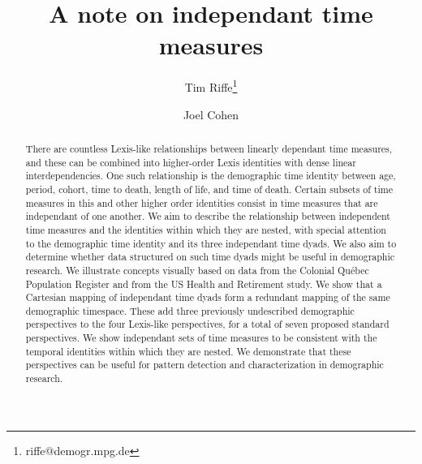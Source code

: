 


\title{A note on independant time measures}

\author[1]{Tim Riffe\thanks{riffe@demogr.mpg.de}}
\author[2]{Joel Cohen}





\maketitle

\vspace{-2em}
\begin{abstract}
 There are countless Lexis-like relationships between
linearly dependant time measures, and these can be combined into higher-order
Lexis identities with dense linear interdependencies. One such relationship is
the demographic time identity between age, period, cohort, time to death, length of life, and time of death. Certain subsets of time measures in this
and other higher order identities consist in time measures that are independant
of one another.
 We aim to describe the relationship between
independent time measures and the identities within which they are nested, with
special attention to the demographic time identity and its three independant
time dyads. We also aim to determine whether data structured on such time dyads
might be useful in demographic research.
 We illustrate concepts visually based on data from the
Colonial Qu\'{e}bec Population Register and from the US Health and Retirement study.
  We show that a Cartesian mapping of independant time dyads form a redundant mapping of the same demographic timespace. These add three previously undescribed demographic perspectives to the four Lexis-like perspectives, for a total of seven proposed standard perspectives. 
 We show independant sets of time measures to be consistent
with the temporal identities within which they are nested. We demonstrate that
these perspectives can be useful for pattern detection and characterization
in demographic research.
\end{abstract}

